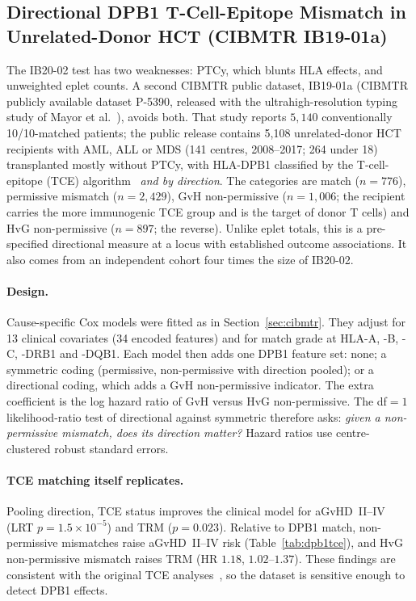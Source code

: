 \documentclass[11pt,a4paper]{article}
\begin{document}
\subsection{Directional DPB1 T-Cell-Epitope Mismatch in Unrelated-Donor HCT (CIBMTR IB19-01a)}
\label{sec:dpb1tce}

The IB20-02 test has two weaknesses: PTCy, which blunts HLA effects, and
unweighted eplet counts.  A second CIBMTR public dataset, IB19-01a
(CIBMTR publicly available dataset P-5390, released with the
ultrahigh-resolution typing study of Mayor et al.~\citep{mayor2021uhr}), avoids both.
That study reports $5{,}140$ conventionally 10/10-matched patients; the
public release contains
5{,}108 unrelated-donor HCT recipients with AML, ALL or MDS (141 centres,
2008--2017; 264 under 18) transplanted mostly without PTCy, with HLA-DPB1
classified by the T-cell-epitope (TCE) algorithm~\citep{fleischhauer2012hla}
\emph{and by direction}.  The categories are match ($n=776$), permissive
mismatch ($n=2{,}429$), GvH non-permissive ($n=1{,}006$; the recipient
carries the more immunogenic TCE group and is the target of donor T cells)
and HvG non-permissive ($n=897$; the reverse).  Unlike eplet totals, this is
a pre-specified directional measure at a locus with established outcome
associations.  It also comes from an independent cohort four times the size
of IB20-02.

\paragraph{Design.}
Cause-specific Cox models were fitted as in Section~\ref{sec:cibmtr}.  They
adjust for 13 clinical covariates (34 encoded features) and for match grade
at HLA-A, -B, -C, -DRB1 and -DQB1.  Each model then adds one DPB1 feature
set: none; a symmetric coding (permissive, non-permissive with direction
pooled); or a directional coding, which adds a GvH non-permissive indicator.
The extra coefficient is the log hazard ratio of GvH versus HvG
non-permissive.  The df${}=1$ likelihood-ratio test of directional against
symmetric therefore asks: \emph{given a non-permissive mismatch, does its
direction matter?}  Hazard ratios use centre-clustered robust standard
errors.

\paragraph{TCE matching itself replicates.}
Pooling direction, TCE status improves the clinical model for aGvHD~II--IV
(LRT $p=1.5\times10^{-5}$) and TRM ($p=0.023$).  Relative to DPB1 match,
non-permissive mismatches raise aGvHD~II--IV risk
(Table~\ref{tab:dpb1tce}), and HvG non-permissive mismatch raises TRM
(HR $1.18$, $1.02$--$1.37$).  These findings are consistent with the original
TCE analyses~\citep{fleischhauer2012hla}, so the dataset is sensitive enough
to detect DPB1 effects.
\end{document}
